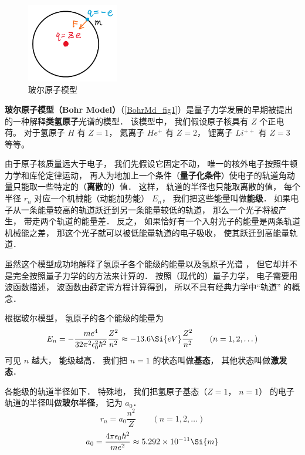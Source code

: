 

\begin{figure}[ht]
\centering
\includegraphics[width=4cm]{./figures/BohrMd1.png}
\caption{玻尔原子模型} \label{BohrMd_fig1}
\end{figure}

\textbf{玻尔原子模型（Bohr Model）}（\autoref{BohrMd_fig1}）是量子力学发展的早期被提出的一种解释\textbf{类氢原子}光谱的模型． 该模型中， 我们假设原子核具有 $Z$ 个正电荷。 对于氢原子 $H$ 有 $Z = 1$， 氦离子 $He^+$ 有 $Z = 2$， 锂离子 $Li^{++}$ 有 $Z = 3$ 等等。

由于原子核质量远大于电子， 我们先假设它固定不动， %
唯一的核外电子按照牛顿力学和库伦定律运动， 再人为地加上一个条件（\textbf{量子化条件}）使电子的轨道角动量只能取一些特定的（\textbf{离散}的）值． 这样， 轨道的半径也只能取离散的值， 每个半径 $r_n$ 对应一个机械能（动能加势能） $E_n$， 我们把这些能量叫做\textbf{能级}． 如果电子从一条能量较高的轨道跃迁到另一条能量较低的轨道， 那么一个光子将被产生， 带走两个轨道的能量差． 反之， 如果恰好有一个入射光子的能量是两条轨道机械能之差， 那这个光子就可以被低能量轨道的电子吸收， 使其跃迁到高能量轨道．

虽然这个模型成功地解释了氢原子各个能级的能量以及氢原子光谱%
， 但它却并不是完全按照量子力学的的方法来计算的． 按照（现代的）量子力学， 电子需要用波函数描述， 波函数由薛定谔方程计算得到， 所以不具有经典力学中“轨道” 的概念．

根据玻尔模型， 氢原子的各个能级的能量为
\begin{equation}
E_n =  - \frac{m e^4}{32 \pi^2 \epsilon_0^2 \hbar ^2} \frac{Z^2}{n^2} \approx - 13.6\Si{eV} \frac{Z^2}{n^2}
\qquad (n = 1, 2, \dots)
\end{equation}
可见 $n$ 越大， 能级越高． 我们把 $n = 1$ 的状态叫做\textbf{基态}， 其他状态叫做\textbf{激发态}． 

各能级的轨道半径如下． 特殊地， 我们把氢原子基态（$Z = 1$， $n = 1$） 的电子轨道的半径叫做\textbf{玻尔半径}， 记为 $a_0$．
\begin{equation}\label{BohrMd_eq1}
r_n = a_0 \frac{n^2}{Z}
\qquad (n = 1, 2, \dots)
\end{equation}
\begin{equation}
a_0 = \frac{4\pi \epsilon_0 \hbar^2}{m e^2} \approx 5.292\times 10^{-11}\Si{m}
\end{equation}


